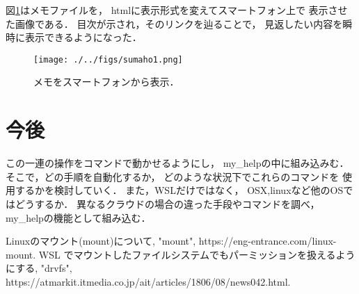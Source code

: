 \documentclass[a4j,twocolumn]{jsarticle}
\begin{document}
図\ref{fig:org9c2d906}はメモファイルを，
htmlに表示形式を変えてスマートフォン上で
表示させた画像である．
目次が示され，そのリンクを辿ることで，
見返したい内容を瞬時に表示できるようになった．

\begin{figure}[htbp]
\centering
\texttt{[image: ./../figs/sumaho1.png]}
\caption{\label{fig:org9c2d906}メモをスマートフォンから表示．}
\end{figure}

\section{今後}
\label{sec:orgbdc123f}
この一連の操作をコマンドで動かせるようにし，
my\_helpの中に組み込みむ．
そこで，どの手順を自動化するか，
どのような状況下でこれらのコマンドを
使用するかを検討していく．
また，WSLだけではなく，
OSX,linuxなど他のOSではどうするか．
異なるクラウドの場合の違った手段やコマンドを調べ，
my\_helpの機能として組み込む．


\small\setlength\baselineskip{10pt}
\begin{thebibliography}{9}
 Linuxのマウント(mount)について, "mount", https://eng-entrance.com/linux-mount.
 WSL でマウントしたファイルシステムでもパーミッションを扱えるようにする, "drvfs", https://atmarkit.itmedia.co.jp/ait/articles/1806/08/news042.html.
\end{thebibliography}
\end{document}
